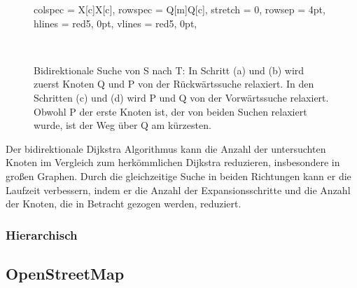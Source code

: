 \begin{figure}[H]
\begin{tblr}{
        colspec = {X[c]X[c]},
        rowspec = {Q[m]Q[c]},
        stretch = 0,
        rowsep = 4pt,
        hlines = {red5, 0pt},
        vlines = {red5, 0pt},
        }
 \\
    \end{tblr}
    \caption{Bidirektionale Suche von S nach T: In Schritt (a) und (b) wird zuerst Knoten Q und P von der
        Rückwärtssuche relaxiert. In den Schritten (c) und (d) wird P und Q von der Vorwärtssuche
        relaxiert. Obwohl P der erste Knoten  ist, der von beiden Suchen relaxiert wurde, ist der
        Weg über Q am kürzesten.}
    \label{fig:bidirectional_dijkstra}
\end{figure}

Der bidirektionale Dijkstra Algorithmus kann die Anzahl der untersuchten Knoten im Vergleich zum
herkömmlichen Dijkstra reduzieren, insbesondere in großen Graphen. Durch die gleichzeitige Suche in
beiden Richtungen kann er die Laufzeit verbessern, indem er die Anzahl der Expansionsschritte und
die Anzahl der Knoten, die in Betracht gezogen werden, reduziert.
\subsubsection{Hierarchisch}

\subsection{OpenStreetMap}